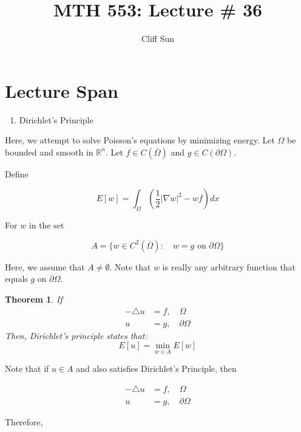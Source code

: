 \documentclass{article}
\title{MTH 553: Lecture \# 36}
\author{Cliff Sun}
\newtheorem{theorem}{Theorem}[section]
\newtheorem{one minute paper}[theorem]{One Minute Paper}
\begin{document}
\maketitle

\section*{Lecture Span}
\begin{enumerate}
    \item Dirichlet's Principle
\end{enumerate}

Here, we attempt to solve Poisson's equations by minimizing energy. Let $\Omega$ be bounded and smooth in $\mathbb{R}^n$. Let $f \in C\left( \overline{\Omega} \right)$ and $g \in C(\partial \Omega)$. 

Define 

\begin{equation}
    E[w] = \int_{\Omega}\left( \frac{1}{2}|\nabla w|^2 - w f \right)dx
\end{equation}

For $w$ in the set 

\begin{equation}
    A = \{w \in C^2(\overline{\Omega}): \quad w = g \text{ on $\partial \Omega$}\}
\end{equation}

Here, we assume that $A \neq \emptyset$. Note that $w$ is really any arbitrary function that equals $g$ on $\partial \Omega$. 

\begin{theorem}
    If 
    \begin{align}
        -\triangle u &= f, \quad \Omega \\
        u &= g, \quad \partial \Omega
    \end{align}
    Then, Dirichlet's principle states that:
    \begin{equation}
        E[u] = \min_{w \in A}E[w]
    \end{equation}
\end{theorem}

Note that if $u \in A$ and also satisfies Dirichlet's Principle, then 

\begin{align}
        -\triangle u &= f, \quad \Omega \\
        u &= g, \quad \partial \Omega
\end{align}

Therefore, 
\end{document}
